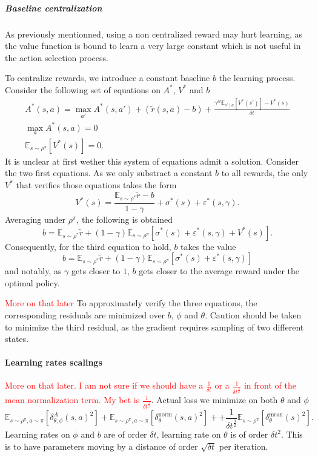 \documentclass[11pt]{article}
\newcommand{\deltat}{{\delta t}}
\newcommand{\E}{\mathbb{E}}
\newcommand{\TODO}[1]{\textcolor{red}{#1}}
\begin{document}
\subparagraph{Baseline centralization}
As previously mentionned, using a non centralized reward may hurt learning, as the
value function is bound to learn a very large constant which is not useful in the
action selection process.

To centralize rewards, we introduce a constant baseline $b$ the learning process.
Consider the following set of equations on $A^*$, $V^*$ and $b$
\begin{gather}
	A^*(s, a) = \max\limits_{a'} A^*(s, a') + 
		(\tilde{r}(s, a) - b)
		 + 
		\frac{\gamma^\deltat \E_{s'\mid a}\left[
			V^*(s')
		\right] - V^*(s)
		}{
		\deltat
	}\\
	\max\limits_{a} A^*(s, a) = 0\\
	\E_{s\sim \rho^\pi}\left[V^*(s)\right] = 0
	.
\end{gather}
It is unclear at first wether this system of equations admit a solution.
Consider the two first equations. As we only substract a constant $b$ to all
rewards, the only $V^*$ that verifies those equations takes the form
\begin{equation}
	V^*(s) = \frac{\E_{s\sim\rho^*}\tilde{r} - b}{1 - \gamma} +
	\sigma^*(s) + \varepsilon^*(s, \gamma).
\end{equation}
Averaging under $\rho^\pi$, the following is obtained
\begin{equation}
	b = \E_{s\sim\rho^*}\tilde{r} +
	(1 - \gamma) \E_{s\sim\rho^\pi}\left[\sigma^*(s) +
		\varepsilon^*(s, \gamma) +
		V^*(s)
	\right].
\end{equation}
Consequently, for the third equation to hold, $b$ takes the value
\begin{equation}
	b = \E_{s\sim\rho^*}\tilde{r} +
	(1 - \gamma) \E_{s\sim\rho^\pi}\left[\sigma^*(s) +
		\varepsilon^*(s, \gamma)
	\right]
\end{equation}
and notably, as $\gamma$ gets closer to $1$, $b$ gets closer to the
average reward under the optimal policy.

\TODO{More on that later}
To approximately verify the three equations, the corresponding residuals are
minimized over $b$, $\phi$ and $\theta$. Caution should be taken to minimize
the third residual, as the gradient requires sampling of two different states.

\paragraph{Learning rates scalings}
\TODO{More on that later. I am not sure if we should have a $\frac{1}{\deltat}$
	or a $\frac{1}{\deltat^\frac{3}{2}}$ in front of the mean normalization
term. My bet is $\frac{1}{\deltat^\frac{3}{2}}$}.
Actual loss we minimize on both $\theta$ and $\phi$
\begin{equation}
	\E_{s \sim \rho^\pi, a \sim \pi}\left[\delta^A_{\theta, \phi}(s, a)^2\right] +
	\E_{s \sim \rho^\pi, a \sim \pi}\left[\delta^\text{norm}_{\theta}(s, a)^2\right] +
	+ \frac{1}{\deltat^\frac{3}{2}}\E_{s \sim \rho^\pi}\left[\delta^\text{mean}_{\theta}(s)^2\right].
\end{equation}
Learning rates on $\phi$ and $b$ are of order $\deltat$, learning rate on $\theta$ is of order $\deltat^2$. This is to have parameters
moving by a distance of order $\sqrt{\deltat}$ per iteration.
\end{document}
